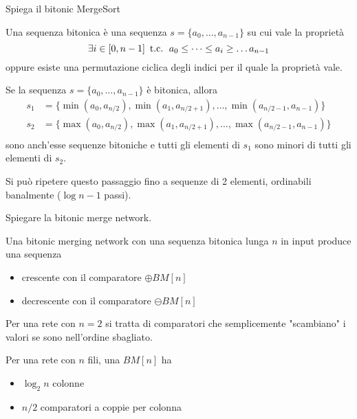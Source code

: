 \begin{questions}
    \question Spiega il bitonic MergeSort
    
    \begin{solution}
        Una sequenza bitonica è una sequenza $s = \{a_0, \dots, a_{n-1}\}$ su cui vale la proprietà
        $$ \exists i \in [0, n-1] \, \text{ t.c. } \, a_0 \leq \dots \leq a_i \geq \dots a_{n-1} $$
        oppure esiste una permutazione ciclica degli indici per il quale la proprietà vale.
        
        Se la sequenza $s = \{a_0, \dots, a_{n-1}\}$ è bitonica, allora
        \begin{align*}
            s_1 & = \{\min(a_0, a_{n/2}), \min(a_1, a_{n/2 + 1}), \dots, \min (a_{n/2 - 1}, a_{n-1})\} \\
            s_2 & = \{\max(a_0, a_{n/2}), \max(a_1, a_{n/2 + 1}), \dots, \max (a_{n/2 - 1}, a_{n-1})\} \\
        \end{align*}
        sono anch'esse sequenze bitoniche e tutti gli elementi di $s_1$ sono minori di tutti gli elementi di $s_2$.
        
        Si può ripetere questo passaggio fino a sequenze di 2 elementi, ordinabili banalmente ($\log n - 1$ passi).
    \end{solution}
    
    \question Spiegare la bitonic merge network.
    
    \begin{solution}
        Una bitonic merging network con una sequenza bitonica lunga $n$ in input produce una sequenza 
        \begin{itemize}
            \item crescente con il comparatore $\oplus BM[n]$
            \item decrescente con il comparatore $\ominus BM[n]$
        \end{itemize}
        
        Per una rete con $n=2$ si tratta di comparatori che semplicemente "scambiano" i valori se sono nell'ordine sbagliato. 
        
        Per una rete con $n$ fili, una $BM[n]$ ha
        \begin{itemize}
            \item $\log_2 n$ colonne
            
            \item $n/2$ comparatori a coppie per colonna
        \end{itemize}
        

\end{solution}
\end{questions}
